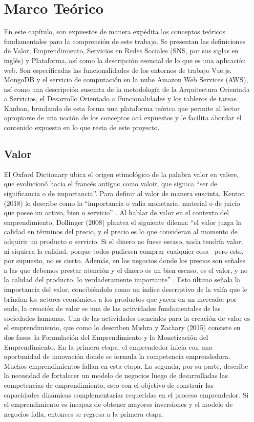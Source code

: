 \chapter{Marco Teórico}

En este capítulo, son expuestos de manera expédita los conceptos teóricos fundamentales para la comprensión de este trabajo. Se presentan las definiciones de Valor, Emprendimiento, Servicios en Redes Sociales (SNS, por sus siglas en inglés) y Plataforma, así como la descripción esencial de lo que es una aplicación web. Son especificadas las funcionalidades de los entornos de trabajo Vue.js, MongoDB y el servicio de computación en la nube Amazon Web Services (AWS), así como una descripción suscinta de la metodología de la Arquitectura Orientada a Servicios, el Desarrollo Orientado a Funcionalidades y los tableros de tareas Kanban, brindando de esta forma una plataforma teórica que permite al lector apropiarse de una noción de los conceptos acá expuestos y le facilita abordar el contenido expuesto en lo que resta de este proyecto.

\section{Valor}
El Oxford Dictionary ubica el origen etimológico de la palabra valor en valere, que evolucionó hacia el francés antiguo como valoir, que signica “ser de significancia o de importancia”. Para definir al valor de manera suscinta, Kenton (2018) lo describe como la “importancia o valía monetaria, material o de juicio que posee un activo, bien o servicio” \cite{kenton2021}.  Al hablar de valor en el contexto del emprendimiento, Dollinger (2008) plantea el siguiente dilema: “el valor juzga la calidad en términos del precio, y el precio es lo que consideran al momento de adquirir un producto o servicio. Si el dinero no fuese escaso, nada tendría valor, ni siquiera la calidad, porque todos pudiesen comprar cualquier cosa –pero esto, por supuesto, no es cierto. Además, en los negocios donde los precios son señales a las que debemos prestar atención y el dinero es un bien escaso, es el valor, y no la calidad del producto, lo verdaderamente importante” \cite{dollinger2008}. Esto último señala la importancia del valor, concibiéndolo como un índice descriptivo de la valía que le brindan los actores económicos a los productos que yacen en un mercado: por ende, la creación de valor es una de las actividades fundamentales de las sociedades humanas. Una de las actividades esenciales para la creación de valor es el emprendimiento, que como lo describen Mishra y Zachary (2015) consiste en dos fases: la Formulación del Emprendimiento y la Monetización del Emprendimiento. En la primera etapa, el emprendedor inicia con una oportunidad de innovación donde se formula la competencia emprendedora. Muchos emprendimientos fallan en esta etapa. La segunda, por su parte, describe la necesidad de fortalecer un modelo de negocios luego de desarrolladas las competencias de emprendimiento, esto con el objetivo de construir las capacidades dinámicas complementarias requeridas en el proceso emprendedor. Si el emprendimiento es incapaz de obtener mayores inversiones y el modelo de negocios falla, entonces se regresa a la primera etapa.\cite{Mishra2015}


